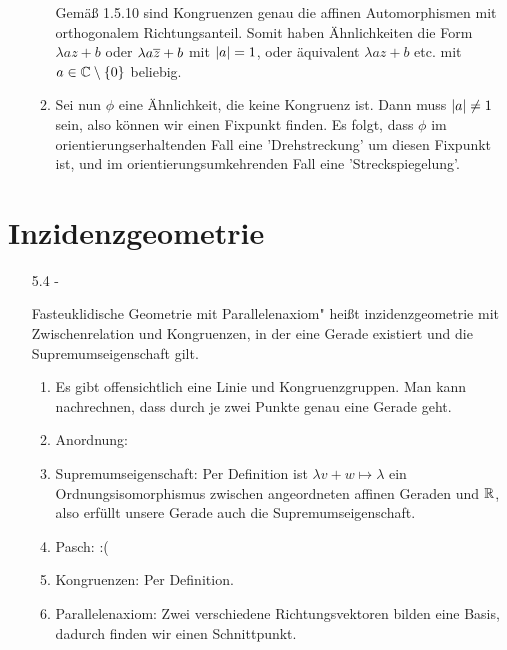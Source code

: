 \documentclass{article}
\begin{document}
\begin{enumerate}
\begin{enumerate}
			Gemäß 1.5.10 sind Kongruenzen genau die affinen Automorphismen mit orthogonalem Richtungsanteil. Somit haben Ähnlichkeiten die Form $\lambda az + b$ oder $\lambda a \ol z +b$ mit $\abs{a} = 1$, oder äquivalent $\lambda a z + b$ etc. mit $a \in \bC \setminus \lr{0}$ beliebig.
			\item Sei nun $\phi$ eine Ähnlichkeit, die keine Kongruenz ist. Dann muss $\abs{a} \neq 1$ sein, also können wir einen Fixpunkt finden. Es folgt, dass $\phi$ im orientierungserhaltenden Fall eine 'Drehstreckung' um diesen Fixpunkt ist, und im orientierungsumkehrenden Fall eine 'Streckspiegelung'.
		\end{enumerate}	
	\end{enumerate}

	\clearpage
	
	\section*{Inzidenzgeometrie}
	\begin{enumerate}
		\item[5.4 - \tbf{3}] 
	
		Fasteuklidische Geometrie mit Parallelenaxiom" heißt inzidenzgeometrie mit Zwischenrelation und Kongruenzen, in der eine Gerade existiert und die Supremumseigenschaft gilt.
		\begin{enumerate}
			\item Es gibt offensichtlich eine Linie und Kongruenzgruppen. Man kann nachrechnen, dass durch je zwei Punkte genau eine Gerade geht.
			\item Anordnung:
			\item Supremumseigenschaft: Per Definition ist $\lambda v + w \mapsto \lambda$ ein Ordnungsisomorphismus zwischen angeordneten affinen Geraden und $\mathbb{R}$, also erfüllt unsere Gerade auch die Supremumseigenschaft.
			\item Pasch: :(
			\item Kongruenzen: Per Definition.
			\item Parallelenaxiom: Zwei verschiedene Richtungsvektoren bilden eine Basis, dadurch finden wir einen Schnittpunkt.
		\end{enumerate}
	\end{enumerate}
	
\end{document}
